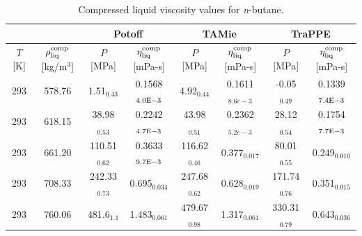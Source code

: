 \documentclass[preprint,review,11pt]{elsarticle}
\begin{document}
	\begin{table}[H]
		\caption{Compressed liquid viscosity values for \textit{n}-butane.}
		\begin{center}
			\begin{tabular}{|c|c|c|c|c|c|c|c|}
				\hline
				&                  & \multicolumn{2}{c|}{Potoff}     & \multicolumn{2}{c|}{TAMie}      & \multicolumn{2}{c|}{TraPPE}    \\ \hline
				$T$ {[}K{]} & $\rho^{\rm comp}_{\rm liq}$ {[}kg/m$^3${]} & $P$ {[}MPa{]}    & $\eta^{\rm comp}_{\rm liq}$ {[}mPa-s{]} & $P$ {[}MPa{]}    & $\eta^{\rm comp}_{\rm liq}$ {[}mPa-s{]} & $P$ {[}MPa{]}   & $\eta^{\rm comp}_{\rm liq}$ {[}mPa-s{]} \\ \hline
				293         & 578.76                                     & 1.51$_{0.43}$    & 0.1568$_{4.0 \rm E-3}$                      & 4.92$_{0.44}$    &	0.1611$_{8.6e-3}$                       & -0.05$_{0.49}$  & 0.1339$_{7.4 \rm E-3}$                      \\ \hline
				293         & 618.15                                     & 38.98$_{0.53}$   & 0.2242$_{4.7 \rm E-3}$                      & 43.98$_{0.51}$	 &  0.2362$_{5.2e-3}$                      & 28.12$_{0.54}$  & 0.1754$_{7.7 \rm E-3}$                      \\ \hline
				293         & 661.20                                     & 110.51$_{0.62}$  & 0.3633$_{9.7 \rm E-3}$                      & 116.62$_{0.46}$	 &  0.377$_{0.017}$                        & 80.01$_{0.55}$  & 0.249$_{0.010}$                        \\ \hline
				293         & 708.33                                     & 242.33$_{0.73}$  & 0.695$_{0.034}$                        & 247.68$_{0.62}$	     &  0.628$_{0.019}$                        & 171.74$_{0.76}$ & 0.351$_{0.015}$                        \\ \hline
				293         & 760.06                                     & 481.6$_{1.1}$    & 1.483$_{0.061}$                        & 479.67$_{0.98}$	     &  1.317$_{0.061}$                        & 330.31$_{0.79}$ & 0.643$_{0.036}$                        \\ \hline
			\end{tabular}
		\end{center}
	\end{table}
\end{document}
